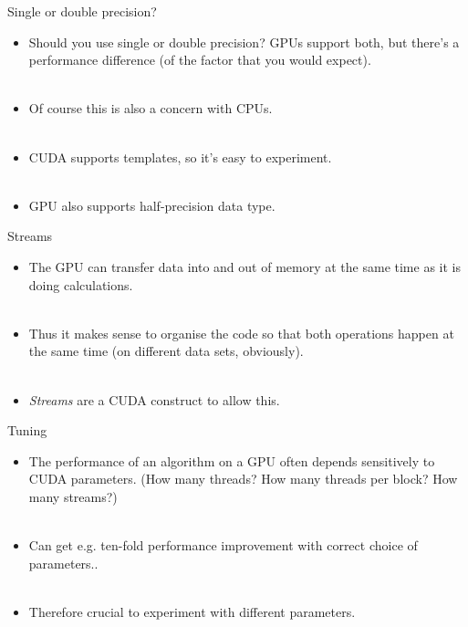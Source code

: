 \documentclass[usenames,dvipsnames]{beamer}
\begin{document}
\begin{frame}{Single or double precision?}
  \begin{block}{}
    \begin{itemize}
      \item{Should you use single or double precision? GPUs support both, but there's a performance difference (of the factor that you would expect).}\\~\
      \item{Of course this is also a concern with CPUs.}\\~\
      \item{CUDA supports templates, so it's easy to experiment.}\\~\
      \item{GPU also supports half-precision data type.}
    \end{itemize}
  \end{block}
\end{frame}

\begin{frame}{Streams}
  \begin{block}{}
    \begin{itemize}
      \item{The GPU can transfer data into and out of memory at the same time as it is doing calculations.}\\~\
      \item{Thus it makes sense to organise the code so that both operations happen at the same time (on different data sets, obviously).}\\~\
      \item{\textit{Streams} are a CUDA construct to allow this.}
    \end{itemize}
  \end{block}
\end{frame}

\begin{frame}{Tuning}
  \begin{block}{}
    \begin{itemize}
      \item{The performance of an algorithm on a GPU often depends sensitively to CUDA parameters. (How many threads? How many threads per block? How many streams?)}\\~\
      \item{Can get e.g. ten-fold performance improvement with correct choice of parameters..}\\~\
      \item{Therefore crucial to experiment with different parameters.}
    \end{itemize}
  \end{block}
\end{frame}
\end{document}
